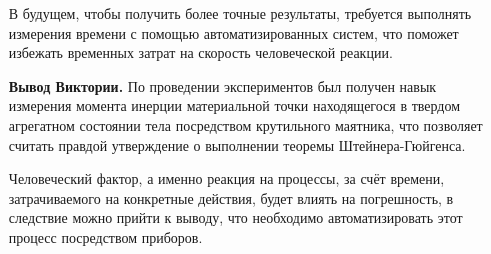 \documentclass[otchet]{SCWorks}
\begin{document}
\begin{enumerate}[leftmargin=3.5cm]
    В будущем, чтобы получить более точные результаты, требуется выполнять измерения времени с помощью автоматизированных систем, что поможет избежать временных затрат на скорость человеческой реакции. 
    \item[\bf Вывод Виктории.]
    По проведении экспериментов был получен навык измерения момента инерции материальной точки находящегося в твердом агрегатном состоянии тела посредством крутильного маятника, что позволяет считать правдой утверждение о выполнении теоремы Штейнера-Гюйгенса.
    
    Человеческий фактор, а именно реакция на процессы, за счёт времени, затрачиваемого на конкретные действия, будет влиять на погрешность, в следствие можно прийти к выводу, что необходимо автоматизировать этот процесс посредством приборов.

\end{enumerate}
\end{document}
